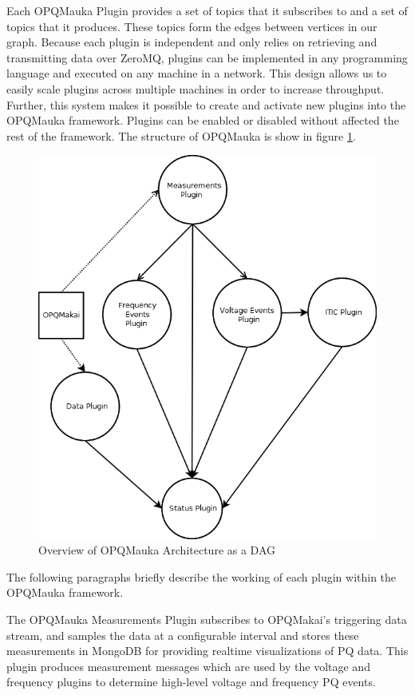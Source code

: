 \documentclass[a4paper, conference]{IEEEtran}
\begin{document}
Each OPQMauka Plugin provides a set of topics that it subscribes to and a set of topics that it produces. These topics form the edges between vertices in our graph. Because each plugin is independent and only relies on retrieving and transmitting data over ZeroMQ, plugins can be implemented in any programming language and executed on any machine in a network. This design allows us to easily scale plugins across multiple machines in order to increase throughput. Further, this system makes it possible to create and activate new plugins into the OPQMauka framework. Plugins can be enabled or disabled without affected the rest of the framework. The structure of OPQMauka is show in figure \ref{fig:opqmauka}.

\begin{figure}
	\includegraphics[width=1.0\linewidth]{img/opqmauka}
	\caption[OPQ Mauka DAG]{Overview of OPQMauka Architecture as a DAG}
	\label{fig:opqmauka}
\end{figure}

The following paragraphs briefly describe the working of each plugin within the OPQMauka framework.

The OPQMauka Measurements Plugin subscribes to OPQMakai's triggering data stream, and samples the data at a configurable interval and stores these measurements in MongoDB for providing realtime visualizations of PQ data. This plugin produces measurement messages which are used by the voltage and frequency plugins to determine high-level voltage and frequency PQ events.
\end{document}
